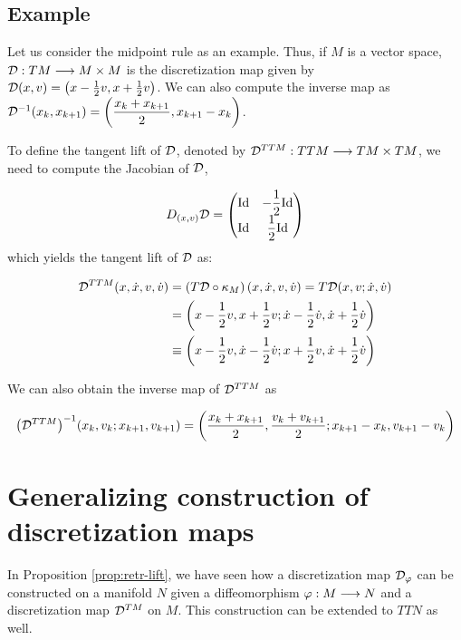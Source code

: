 \subsection{Example}

Let us consider the midpoint rule as an example. Thus, if $M$ is a vector space, $\mathcal{D} : TM \longrightarrow M \times M$ is the discretization map given by $\mathcal{D}(x,v) = \left( x - \frac{1}{2}v, x + \frac{1}{2}v \right)$. We can also compute the inverse map as $\mathcal{D}^{-1}(x_k, x_{k+1}) = \left(\dfrac{x_k + x_{k+1}}{2}, x_{k+1} - x_k \right)$.

\newpage

To define the tangent lift of $\mathcal{D}$, denoted by $\mathcal{D}^{TTM}: TTM \longrightarrow TM \times TM$, we need to compute the Jacobian of $\mathcal{D}$,

\[
  D_{(x,v)} \mathcal{D} = \begin{pmatrix} \text{Id} & -\dfrac{1}{2} \text{Id} \\ \text{Id} & \dfrac{1}{2} \text{Id}\end{pmatrix}
\]
which yields the tangent lift of $\mathcal{D}$ as:

\begin{equation*}
  \begin{split}
    \mathcal{D}^{TTM} (x, \dot{x}, v, \dot{v}) &= (T\mathcal{D} \circ \kappa_M)\left( x, \dot{x}, v, \dot{v} \right) = T\mathcal{D}(x, v ; \dot{x}, \dot{v}) \\
    &= \left( x - \dfrac{1}{2}v, x + \dfrac{1}{2}v ; \dot{x} - \dfrac{1}{2}\dot{v}, \dot{x} + \dfrac{1}{2} \dot{v} \right) \\
    & \equiv \left( x - \dfrac{1}{2}v, \dot{x} - \dfrac{1}{2}\dot{v} ; x + \dfrac{1}{2}v, \dot{x} + \dfrac{1}{2} \dot{v} \right)
  \end{split}
\end{equation*}

We can also obtain the inverse map of $\mathcal{D}^{TTM}$ as 

\[ {\left(\mathcal{D}^{TTM}\right)}^{-1} (x_k, v_k; x_{k+1}, v_{k+1}) = \left( \dfrac{x_k + x_{k+1}}{2}, \dfrac{v_k + v_{k+1}}{2}; x_{k+1} - x_k, v_{k+1} - v_k \right) \]

\section{Generalizing construction of discretization maps}

In Proposition \ref{prop:retr-lift}, we have seen how a discretization map $\mathcal{D}_{\varphi}$ can be constructed on a manifold $N$ given a diffeomorphism $\varphi: M \longrightarrow N$ and a discretization map $\mathcal{D}^{TM}$ on $M$. This construction can be extended to $TTN$ as well.

